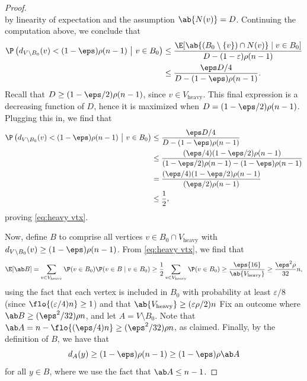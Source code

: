 \begin{proof}
\[    \]
    by linearity of expectation and the assumption $\ab{N(v)}=D$. Continuing the computation above, we conclude that
    \begin{align*}
       \P\left(d_{V\setminus B_0}(v)< (1-\eps)\rho (n-1) ~\middle|~ v\in B_0\right)
        &\leq \frac{\E[\ab{(B_0 \setminus \{v\})\cap N(v)} \mid v \in B_0]}{D-(1-\varepsilon)\rho(n-1)}\\
        &\leq \frac{\eps D/4}{D-(1-\eps)\rho(n-1)}.
    \end{align*}
    Recall that $D \geq (1-\eps/2)\rho(n-1)$, since $v \in V_{\mathrm{heavy}}$.
    This final expression is a decreasing function of $D$, hence it is maximized when $D=(1-\eps/2)\rho(n-1)$. Plugging this in, we find that
    \begin{align*}
       \P\left(d_{V\setminus B_0}(v)< (1-\eps)\rho (n-1) ~\middle|~ v\in B_0\right)
        &\leq \frac{\eps D/4}{D-(1-\eps)\rho(n-1)}\\
        &\leq \frac{(\eps/4)(1-\eps/2)\rho(n-1)}{(1-\eps/2)\rho(n-1)-(1-\eps)\rho(n-1)}\\
        &=\frac{(\eps/4)(1-\eps/2)\rho(n-1)}{(\eps/2)\rho(n-1)}\\
        &\leq \frac 12,
    \end{align*}
    proving \eqref{eq:heavy vtx}.
    
    Now, define $B$ to comprise all vertices $v \in B_0 \cap V_{\mathrm{heavy}}$ with $d_{V \setminus B_0}(v) \geq (1-\eps)\rho (n-1)$. 
    From \eqref{eq:heavy vtx}, we find that
    \[
    \E[\ab B] = \sum_{v \in V_{\mathrm{heavy}}} \P(v \in B_0) \P(v \in B \mid v \in B_0) \geq \frac 12 \sum_{v \in V_{\mathrm{heavy}}} \P(v \in B_0) \geq \frac \eps {16} \ab{V_{\mathrm{heavy}}} \geq \frac{\eps^2\rho}{32}n,
    \]
    using the fact that each vertex is included in $B_0$ with probability at least $\varepsilon/8$ (since $\flo{(\varepsilon/4)n}\geq1$) and that $\ab{V_{\mathrm{heavy}}}\geq (\varepsilon\rho/2)n$
    Fix an outcome where $\ab B \geq (\eps^2/32)\rho n$, and let $A = V \setminus B_0$. Note that $\ab A = n - \flo{(\eps/4)n}\geq (\eps^2/32)\rho n$, as claimed. Finally, by the definition of $B$, we have that
    \[
    d_A(y) \geq (1-\eps)\rho (n-1) \geq (1-\eps)\rho \ab A
    \]
    for all $y \in B$, where we use the fact that $\ab A \leq n-1$.
\end{proof}

